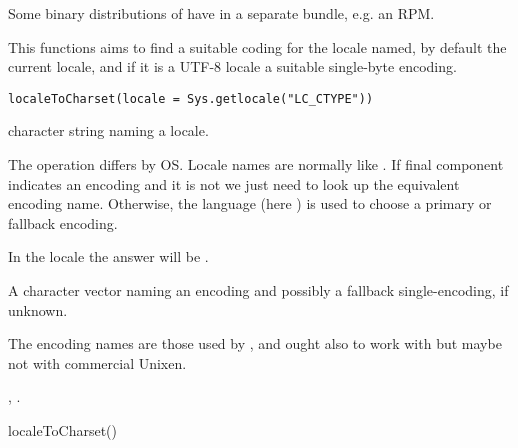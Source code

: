 %
\begin{Note}\relax
Some binary distributions of \R{} have  in a separate
bundle, e.g. an  RPM.
\end{Note}
%
\begin{Description}\relax
This functions aims to find a suitable coding for the locale named, by
default the current locale, and if it is a UTF-8 locale a suitable
single-byte encoding.
\end{Description}
%
\begin{Usage}
\begin{verbatim}
localeToCharset(locale = Sys.getlocale("LC_CTYPE"))
\end{verbatim}
\end{Usage}
%
\begin{Arguments}
\begin{ldescription}
\item[\code{locale}] character string naming a locale.
\end{ldescription}
\end{Arguments}
%
\begin{Details}\relax
The operation differs by OS.
Locale names are normally like .  If final
component indicates an encoding and it is not  we just need
to look up the equivalent encoding name.  Otherwise, the language
(here ) is used to choose a primary or fallback encoding.

In the  locale the answer will be .
\end{Details}
%
\begin{Value}
A character vector naming an encoding and possibly a fallback
single-encoding,   if unknown.
\end{Value}
%
\begin{Note}\relax
The encoding names are those used by , and ought also
to work with  but maybe not with commercial Unixen.
\end{Note}
%
\begin{SeeAlso}\relax
{}, .
\end{SeeAlso}
%
\begin{Examples}
\begin{ExampleCode}
localeToCharset()
\end{ExampleCode}
\end{Examples}
